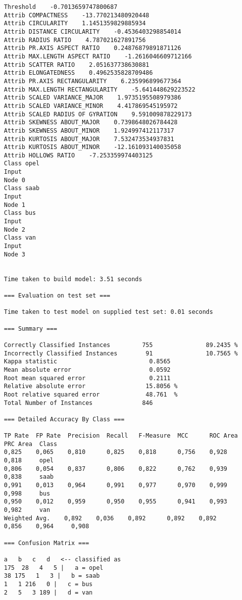\documentclass[
	article,			%
	11pt,				%
	oneside,			%
	a4paper,			%
	english,			%
	brazil,				%
	sumario=tradicional
	]{abntex2}
\begin{document}
\begin{lstlisting}
Threshold    -0.7013659747800687
Attrib COMPACTNESS    -13.770213480920448
Attrib CIRCULARITY    1.1451359829885934
Attrib DISTANCE CIRCULARITY    -0.4536403298854014
Attrib RADIUS RATIO    4.787021627891756
Attrib PR.AXIS ASPECT RATIO    0.24876879891871126
Attrib MAX.LENGTH ASPECT RATIO    -1.2616046609712166
Attrib SCATTER RATIO    2.051637738630881
Attrib ELONGATEDNESS    0.4962535828709486
Attrib PR.AXIS RECTANGULARITY    6.235996899677364
Attrib MAX.LENGTH RECTANGULARITY    -5.641448629223522
Attrib SCALED VARIANCE_MAJOR    1.9735195508979386
Attrib SCALED VARIANCE_MINOR    4.417869545195972
Attrib SCALED RADIUS OF GYRATION    9.591009878229173
Attrib SKEWNESS ABOUT_MAJOR    0.7398648026784428
Attrib SKEWNESS ABOUT_MINOR    1.924997412117317
Attrib KURTOSIS ABOUT_MAJOR    7.532473534937831
Attrib KURTOSIS ABOUT_MINOR    -12.161093140035058
Attrib HOLLOWS RATIO    -7.253359974403125
Class opel
Input
Node 0
Class saab
Input
Node 1
Class bus
Input
Node 2
Class van
Input
Node 3


Time taken to build model: 3.51 seconds

=== Evaluation on test set ===

Time taken to test model on supplied test set: 0.01 seconds

=== Summary ===

Correctly Classified Instances         755               89.2435 %
Incorrectly Classified Instances        91               10.7565 %
Kappa statistic                          0.8565
Mean absolute error                      0.0592
Root mean squared error                  0.2111
Relative absolute error                 15.8056 %
Root relative squared error             48.761  %
Total Number of Instances              846     

=== Detailed Accuracy By Class ===

TP Rate  FP Rate  Precision  Recall   F-Measure  MCC      ROC Area  PRC Area  Class
0,825    0,065    0,810      0,825    0,818      0,756    0,928     0,818     opel
0,806    0,054    0,837      0,806    0,822      0,762    0,939     0,838     saab
0,991    0,013    0,964      0,991    0,977      0,970    0,999     0,998     bus
0,950    0,012    0,959      0,950    0,955      0,941    0,993     0,982     van
Weighted Avg.    0,892    0,036    0,892      0,892    0,892      0,856    0,964     0,908     

=== Confusion Matrix ===

a   b   c   d   <-- classified as
175  28   4   5 |   a = opel
38 175   1   3 |   b = saab
1   1 216   0 |   c = bus
2   5   3 189 |   d = van


\end{lstlisting}
\end{document}
